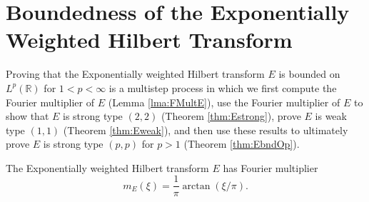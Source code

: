 \documentclass[../dissertation.tex]{subfiles}
\begin{document}
\section{Boundedness of the Exponentially Weighted Hilbert Transform}\label{sec3:BndE}

Proving that the Exponentially weighted Hilbert transform $E$ is bounded on 
$L^p(\mathbb R)$ for $1< p < \infty$ is a multistep process in which we first compute
the Fourier multiplier of $E$ (Lemma \ref{lma:FMultE}), use the Fourier multiplier
of $E$ to show that $E$ is strong type $(2,2)$ (Theorem \ref{thm:Estrong}), prove $E$ is 
weak type $(1, 1)$ (Theorem \ref{thm:Eweak}), and then use these results to ultimately
prove $E$ is strong type $(p, p)$ for $p>1$ (Theorem \ref{thm:EbndOp}).


\begin{lma}\label{lma:FMultE}
	The Exponentially weighted Hilbert transform $E$ has Fourier multiplier
	$$m_E(\xi) = \frac{1}{\pi} \arctan(\xi/\pi).$$
\end{lma}
\end{document}
